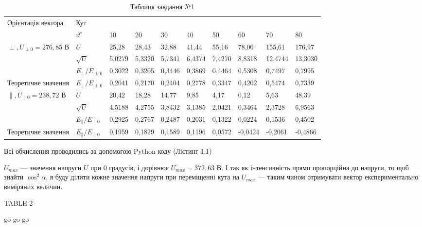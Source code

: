 \documentclass[12pt,a4paper]{article}
\begin{document}
\begin{landscape}
    \begin{table}[ht]
        \centering
        \begin{tabular}{|l|l|l|l|l|l|l|l|l|l|}
        \hline
        \multirow{2}{*}{Орієнтація вектора} & \multicolumn{9}{l|}{Кут}                     \\ \cline{2-10}
                                            & $\vartheta^{\circ}$ & 10 & 20 & 30 & 40 & 50 & 60 & 70 & 80 \\ \hline
        \multirow{3}{*}{$\perp, U_{\perp0} = 276{,}85$ В}               & $U$     & 25,28 &  28,43  &  32,88  &  41,44  &  55,16  &  78,00  &  155,61  &  176,97  \\ \cline{2-10}
                                            & $\sqrt{U}$ &  5,0279  &  5,3320  &  5,7341  &  6,4374  &  7,4270  &  8,8318  &  12,4744  &  13,3030  \\ \cline{2-10}
                                            & $E_{\perp} / E_{\perp0}$   &  0,3022  &  0,3205  &  0,3446  &  0,3869  &  0,4464  & 0,5308  & 0,7497 & 0,7995  \\ \hline
        Теоретичне
        значення                     & $E_{\perp} / E_{\perp0}$   &  0,2041  &  0,2170  &  0,2404  &  0,2778  & 0,3347   &  0,4202  &  0,5474  &  0,7339  \\ \hline
        \multirow{3}{*}{$\parallel, U_{\parallel0} = 238{,}72$ В}        & $U$    &  20,42  &  18,28  &  14,77  &  9,85  &  4,17  &  0,12  &  5,63  & 48,39   \\ \cline{2-10}
                                            & $\sqrt{U}$ &  4,5188  &  4,2755  & 3,8432  &  3,1385  &  2,0421  & 0,3464   &  2,3728  & 6,9563   \\ \cline{2-10}
                                            & $E_{\parallel} / E_{\parallel0}$ & 0,2925   &   0,2767  &   0,2487 &  0,2031  &  0,1322  &  0,0224  &  0,1536  &  0,4502  \\ \hline
        Теоретичне
        значення                     & $E_{\parallel} / E_{\parallel0}$  &  0,1959  &  0,1829  &  0,1589  &  0,1196  &  0,0572  &  -0,0424  &  -0,2061  & -0,4866  \\ \hline
        \end{tabular}
        \caption{Таблиця завдання №1}
    \end{table}

    Всі обчислення проводились за допомогою Python коду (Лістинг 1.1)

    $U_{max}$ --- значення напруги $U$ при 0 градусів, і дорівнює $U_{max} = 372{,}63$ В. І так як інтенсивність прямо пропорційна до напруги, то щоб знайти
    $\cos^2 \alpha$, я буду ділити кожне значення напруги при переміщенні кута на $U_{max}$ --- таким чином отримувати вектор експериментально виміряних величин.

    \end{landscape}

    \newpage

    TABLE 2

    \newpage

    go go go
\end{document}
